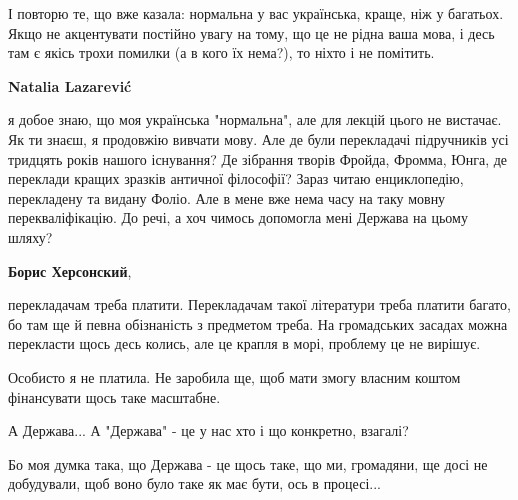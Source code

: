 \begin{itemize}
І повторю те, що вже казала: нормальна у вас українська, краще, ніж у багатьох.
Якщо не акцентувати постійно увагу на тому, що це не рідна ваша мова, і десь
там є якісь трохи помилки (а в кого їх нема?), то ніхто і не помітить.

\begin{itemize}
 
\textbf{Natalia Lazarević} 

я добое знаю, що моя українська "нормальна", але для лекцій цього не вистачає.
Як ти знаєш, я продовжію вивчати мову. Але де були перекладачі підручників усі
тридцять років нашого існування? Де зібрання творів Фройда, Фромма, Юнга, де
переклади кращих зразків античної філософії? Зараз читаю енциклопедію,
перекладену та видану Фоліо. Але в мене вже нема часу на таку мовну
перекваліфікацію. До речі, а хоч чимось допомогла мені Держава на цьому шляху?

 
\textbf{Борис Херсонский}, 

перекладачам треба платити. Перекладачам такої літератури треба платити багато,
бо там ще й певна обізнаність з предметом треба. На громадських засадах можна
перекласти щось десь колись, але це крапля в морі, проблему це не вирішує.

Особисто я не платила. Не заробила ще, щоб мати змогу власним коштом
фінансувати щось таке масштабне.

А Держава... А "Держава" - це у нас хто і що конкретно, взагалі?


 

Бо моя думка така, що Держава - це щось таке, що ми, громадяни, ще досі не
добудували, щоб воно було таке як має бути, ось в процесі...


 

\end{itemize}
\end{itemize}
